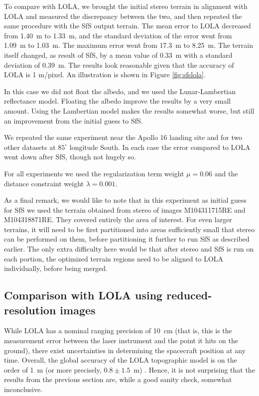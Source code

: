 \documentclass[12pt,oneside]{article}
\begin{document}
To compare with LOLA, we brought the initial stereo terrain 
in alignment with LOLA and measured the discrepancy between the two, and
then repeated the same procedure with the SfS output terrain. 
The mean error to LOLA decreased from 1.40~m to 1.33~m, and the standard deviation of the error
went from 1.09~m to 1.03~m. The maximum error went from 17.3~m to 8.25~m. 
The terrain itself changed, as result of SfS, by a mean value of 0.33~m
with a standard deviation of 0.39~m. The results look reasonable given that the accuracy of
LOLA is 1 m/pixel. An illustration is shown in Figure \ref{fig:sfslola}.

In this case we did not float the albedo, and we used the
Lunar-Lambertian reflectance model.  Floating the albedo improve the
results by a very small amount. Using the Lambertian model makes the results somewhat worse, but still an improvement
from the initial guess to SfS.

We repeated the same experiment near the Apollo 16 landing site and for two
other datasets at $85^\circ$ longitude South. In each case the error compared
to LOLA went down after SfS, though not hugely so.

For all experiments we used the regularization term weight $\mu = 0.06$ and the 
distance constraint weight $\lambda = 0.001.$

As a final remark, we would like to note that in this experiment as
initial guess for SfS we used the terrain obtained from stereo of images
M104311715RE and M104318871RE. They covered entirely the area of
interest. For even larger terrains, it will need to be first partitioned
into areas sufficiently small that stereo can be performed on them,
before partitioning it further to run SfS as described earlier. The only
extra difficulty here would be that after stereo and SfS is run on each
portion, the optimized terrain regions need to be aligned to LOLA
individually, before being merged.

\subsection{Comparison with LOLA using reduced-resolution images}

While LOLA has a nominal ranging precision of 10~cm (that is, this is the measurement
error between the laser instrument and the point it hits on the ground), there exist uncertainties in 
determining the spacecraft position at any time. Overall, the global accuracy of the LOLA topographic
model is on the order of 1~m (or more precisely, $0.8 \pm 1.5$~m) \cite{smith2011results}. Hence, it is not surprising that the results
from the previous section are, while a good sanity check, somewhat inconclusive.
\end{document}
